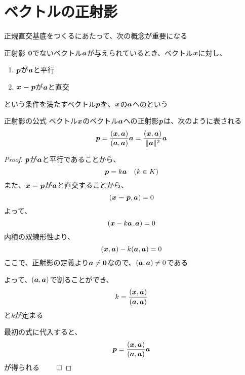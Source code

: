 \documentclass[../../../topic_linear-algebra]{subfiles}
\begin{document}
\sectionline
\section{ベクトルの正射影}

正規直交基底をつくるにあたって、次の概念が重要になる

\begin{definition}{正射影}
  $\vb*{0}$でないベクトル$\vb*{a}$が与えられているとき、ベクトル$\vb*{x}$に対し、
  \begin{enumerate}[label=\romanlabel]
    \item $\vb*{p}$が$\vb*{a}$と平行
    \item $\vb*{x - p}$が$\vb*{a}$と直交
  \end{enumerate}
  という条件を満たすベクトル$\vb*{p}$を、$\vb*{x}$の$\vb*{a}$へのという
\end{definition}

\begin{theorem}{正射影の公式}
  ベクトル$\vb*{x}$のベクトル$\vb*{a}$への正射影$\vb*{p}$は、次のように表される
  \begin{equation*}
    \vb*{p} = \frac{(\vb*{x}, \vb*{a})}{(\vb*{a}, \vb*{a})} \vb*{a} = \frac{(\vb*{x}, \vb*{a})}{\|\vb*{a}\|^2} \vb*{a}
  \end{equation*}
\end{theorem}

\begin{proof}
  $\vb*{p}$が$\vb*{a}$と平行であることから、
  \begin{equation*}
    \vb*{p} = k \vb*{a} \quad (k \in K)
  \end{equation*}
  また、$\vb*{x - p}$が$\vb*{a}$と直交することから、
  \begin{equation*}
    (\vb*{x-p},\vb*{a}) = 0
  \end{equation*}
  よって、
  \begin{equation*}
    (\vb*{x} - k \vb*{a}, \vb*{a}) = 0
  \end{equation*}
  内積の双線形性より、
  \begin{equation*}
    (\vb*{x}, \vb*{a}) - k (\vb*{a}, \vb*{a}) = 0
  \end{equation*}
  ここで、正射影の定義より$\vb*{a} \neq \vb*{0}$なので、$(\vb*{a}, \vb*{a}) \neq 0$である

  よって、$(\vb*{a}, \vb*{a})$で割ることができ、
  \begin{equation*}
    k = \frac{(\vb*{x}, \vb*{a})}{(\vb*{a}, \vb*{a})}
  \end{equation*}
  と$k$が定まる

  最初の式に代入すると、
  \begin{equation*}
    \vb*{p} = \frac{(\vb*{x}, \vb*{a})}{(\vb*{a}, \vb*{a})} \vb*{a}
  \end{equation*}
  が得られる $\qed$
\end{proof}
\end{document}
